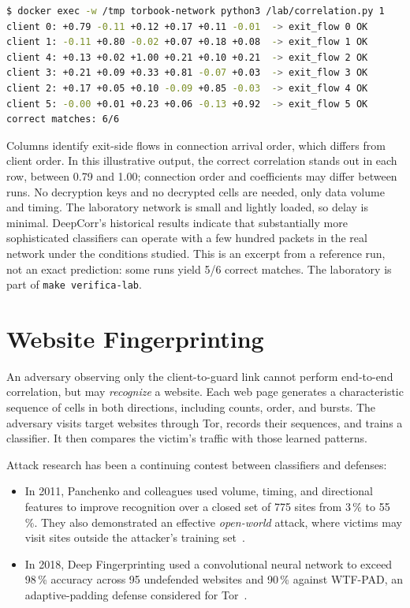 \begin{lstlisting}[language=bash,numbers=none]
$ docker exec -w /tmp torbook-network python3 /lab/correlation.py 1
client 0: +0.79 -0.11 +0.12 +0.17 +0.11 -0.01  -> exit_flow 0 OK
client 1: -0.11 +0.80 -0.02 +0.07 +0.18 +0.08  -> exit_flow 1 OK
client 4: +0.13 +0.02 +1.00 +0.21 +0.10 +0.21  -> exit_flow 2 OK
client 3: +0.21 +0.09 +0.33 +0.81 -0.07 +0.03  -> exit_flow 3 OK
client 2: +0.17 +0.05 +0.10 -0.09 +0.85 -0.03  -> exit_flow 4 OK
client 5: -0.00 +0.01 +0.23 +0.06 -0.13 +0.92  -> exit_flow 5 OK
correct matches: 6/6
\end{lstlisting}
Columns identify exit-side flows in connection arrival order, which differs from client order. In this illustrative output, the correct correlation stands out in each row, between 0.79 and 1.00; connection order and coefficients may differ between runs. No decryption keys and no decrypted cells are needed, only data volume and timing. The laboratory network is small and lightly loaded, so delay is minimal. DeepCorr's historical results indicate that substantially more sophisticated classifiers can operate with a few hundred packets in the real network under the conditions studied. This is an excerpt from a reference run, not an exact prediction: some runs yield 5/6 correct matches. The laboratory is part of \texttt{make verifica-lab}.

\section{Website Fingerprinting}\label{sec:att-wf}

An adversary observing only the client-to-guard link cannot perform end-to-end correlation, but may \emph{recognize} a website. Each web page generates a characteristic sequence of cells in both directions, including counts, order, and bursts. The adversary visits target websites through Tor, records their sequences, and trains a classifier. It then compares the victim's traffic with those learned patterns.

Attack research has been a continuing contest between classifiers and defenses:
\begin{itemize}
  \item In 2011, Panchenko and colleagues used volume, timing, and directional features to improve recognition over a closed set of 775 sites from 3\,\% to 55\,\%. They also demonstrated an effective \emph{open-world} attack, where victims may visit sites outside the attacker's training set~\cite{panchenko2011website}.
  \item In 2018, Deep Fingerprinting used a convolutional neural network to exceed 98\,\% accuracy across 95 undefended websites and 90\,\% against WTF-PAD, an adaptive-padding defense considered for Tor~\cite{sirinam2018deep}.
\end{itemize}

